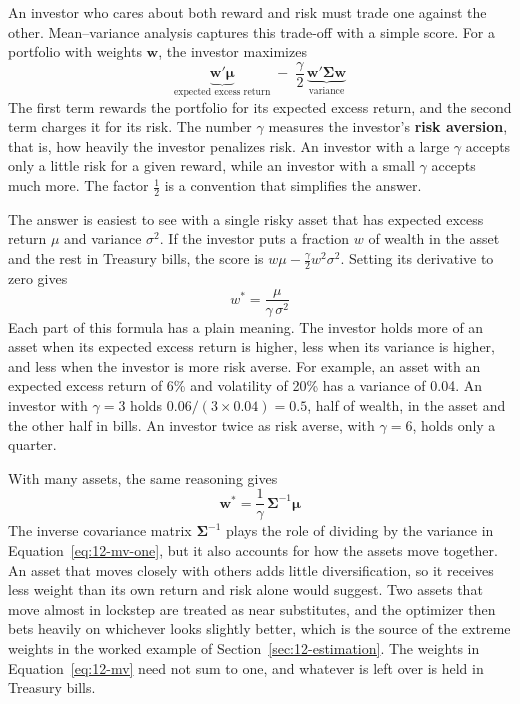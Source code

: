 An investor who cares about both reward and risk must trade one against the other. Mean--variance analysis captures this trade-off with a simple score. For a portfolio with weights $\mathbf{w}$, the investor maximizes
\begin{equation}
  \underbrace{\mathbf{w}'\boldsymbol{\mu}}_{\text{expected excess return}} \; - \; \frac{\gamma}{2}\,\underbrace{\mathbf{w}'\boldsymbol{\Sigma}\mathbf{w}}_{\text{variance}}
  \label{eq:12-mv-objective}
\end{equation}
The first term rewards the portfolio for its expected excess return, and the second term charges it for its risk. The number $\gamma$ measures the investor's \textbf{risk aversion}, that is, how heavily the investor penalizes risk. An investor with a large $\gamma$ accepts only a little risk for a given reward, while an investor with a small $\gamma$ accepts much more. The factor $\tfrac{1}{2}$ is a convention that simplifies the answer.

The answer is easiest to see with a single risky asset that has expected excess return $\mu$ and variance $\sigma^2$. If the investor puts a fraction $w$ of wealth in the asset and the rest in Treasury bills, the score is $w\mu - \tfrac{\gamma}{2} w^2 \sigma^2$. Setting its derivative to zero gives
\begin{equation}
  w^* = \frac{\mu}{\gamma\,\sigma^2}
  \label{eq:12-mv-one}
\end{equation}
Each part of this formula has a plain meaning. The investor holds more of an asset when its expected excess return is higher, less when its variance is higher, and less when the investor is more risk averse. For example, an asset with an expected excess return of 6\% and volatility of 20\% has a variance of 0.04. An investor with $\gamma = 3$ holds $0.06/(3 \times 0.04) = 0.5$, half of wealth, in the asset and the other half in bills. An investor twice as risk averse, with $\gamma = 6$, holds only a quarter.

With many assets, the same reasoning gives
\begin{equation}
  \mathbf{w}^* = \frac{1}{\gamma}\,\boldsymbol{\Sigma}^{-1}\boldsymbol{\mu}
  \label{eq:12-mv}
\end{equation}
The inverse covariance matrix $\boldsymbol{\Sigma}^{-1}$ plays the role of dividing by the variance in Equation~\eqref{eq:12-mv-one}, but it also accounts for how the assets move together. An asset that moves closely with others adds little diversification, so it receives less weight than its own return and risk alone would suggest. Two assets that move almost in lockstep are treated as near substitutes, and the optimizer then bets heavily on whichever looks slightly better, which is the source of the extreme weights in the worked example of Section~\ref{sec:12-estimation}. The weights in Equation~\eqref{eq:12-mv} need not sum to one, and whatever is left over is held in Treasury bills.

